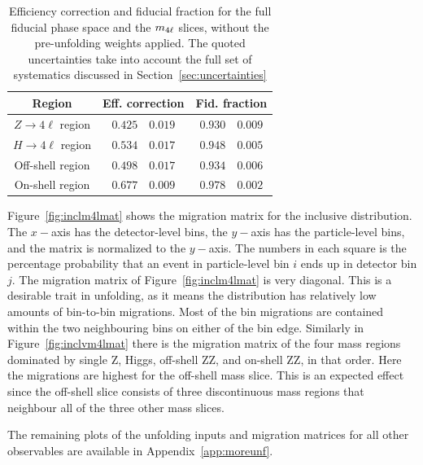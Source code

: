  \begin{table}[ht]
     \centering
     \begin{tabular} { c | r@{$\pm$} l  r@{$\pm$}l }
      \hline
     Region & \multicolumn{2}{c}{Eff. correction}  & \multicolumn{2}{c}{Fid. fraction}   \\
       \hline
       $Z\to 4\ell$ region  & $0.425$ & $0.019$ & $0.930$ & $0.009$ \\
       $H\to 4\ell$ region  & $0.534$ & $0.017$ & $0.948$ & $0.005$ \\
       Off-shell region & $0.498$ & $0.017$ & $0.934$ & $0.006$ \\
       On-shell region  & $0.677$ & $0.009$ & $0.978$ & $0.002$ \\
       \hline
    \end{tabular}
   \caption{Efficiency correction and fiducial fraction for the full fiducial phase space and the $m_{4\ell}$ slices, without the pre-unfolding weights applied. The quoted uncertainties take into account the full set of systematics discussed in Section~\ref{sec:uncertainties} \label{tab:fidxsunf-nopreunfold} }
 \end{table}

Figure~\ref{fig:inclm4lmat} shows the migration matrix for the inclusive \mFourL{} distribution. The $x-$axis has the detector-level bins, the $y-$axis has the particle-level bins, and the matrix is normalized to the $y-$axis. The numbers in each square is the percentage probability that an event in particle-level bin $i$ ends up in detector bin $j$. The migration matrix of Figure~\ref{fig:inclm4lmat} is very diagonal. This is a desirable trait in unfolding, as it means the distribution has relatively low amounts of bin-to-bin migrations. Most of the bin migrations are contained within the two neighbouring bins on either of the bin edge.  Similarly in Figure~\ref{fig:inclvm4lmat} there is the migration matrix of the four mass regions dominated by single Z, Higgs,  off-shell ZZ, and on-shell ZZ, in that order. Here the migrations are highest for the off-shell mass slice. This is an expected effect since the off-shell slice consists of three discontinuous mass regions that neighbour all of the three other mass slices. 

The remaining plots of the unfolding inputs and migration matrices for all other observables are available in Appendix~\ref{app:moreunf}.


